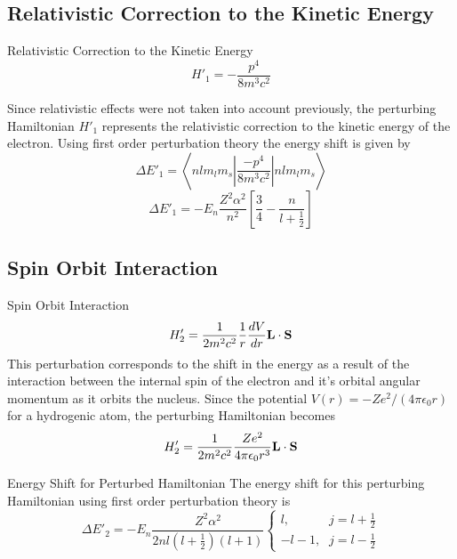 \documentclass[xcolor=dvipsnames,t]{beamer}
\begin{document}
	\subsection{Relativistic Correction to the Kinetic Energy}
    \begin{frame}{Relativistic Correction to the Kinetic Energy} 
	\begin{equation}
		H'_1 = - \frac{p^4}{8m^3c^2}
	\end{equation}

    Since relativistic effects were not taken into account previously, the 
    perturbing Hamiltonian $H'_1$ represents the relativistic correction
    to the kinetic energy of the electron.
    Using first order perturbation theory the energy shift is given by
    \begin{equation} 
        \Delta E'_1 = \left \langle nl m_l m_s 
                        \left|
                            \frac{-p^4}{8m^3 c^2} 
                        \right|
                      nl m_l m_s \right \rangle 
    \end{equation}
    \begin{equation}
        \Delta E'_1 = -E_n \frac{Z^2 \alpha^2}{n^2} 
                        \left[ \frac{3}{4}  - \frac{n}{l + \frac{1}{2}} \right]
    \end{equation}
    \end{frame} 

	\subsection{Spin Orbit Interaction}
    \begin{frame}{Spin Orbit Interaction} 
	\begin{equation}
		H'_2 = \frac{1}{2m^2c^2} \frac{1}{r} \frac{dV}{dr} {\bf L} \cdot {\bf S} 
	\end{equation}
    This perturbation corresponds to the shift in the energy as a result of the interaction
    between the internal spin of the electron and it's orbital angular momentum as it
    orbits the nucleus. Since the potential $V(r) = -Ze^2/(4 \pi \epsilon_0 r)$ for
    a hydrogenic atom, the perturbing Hamiltonian becomes
    \begin{equation}
        H'_2 = \frac{1}{2m^2c^2} \frac{Ze^2}{4\pi \epsilon_0 r^3} {\bf L} \cdot {\bf S}
    \end{equation}
    \end{frame} 

    \begin{frame}{Energy Shift for Perturbed Hamiltonian} 
    The energy shift for this perturbing Hamiltonian using first order perturbation theory is
    \begin{equation}
        \Delta E'_2 = -E_n \frac{Z^2 \alpha^2}{2nl(l + \frac{1}{2})(l + 1)}
        \left\{
            \begin{array}{ll}
                l       \mbox{,} &  j = l + \frac{1}{2} \\
                -l - 1  \mbox{,} &  j = l - \frac{1}{2}
            \end{array}
        \right.
    \end{equation}
    \end{frame} 
\end{document}
